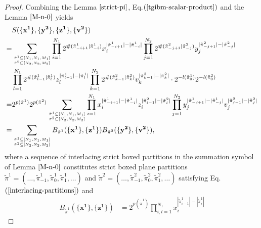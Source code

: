 \documentclass[11pt,reqno]{amsart}
\numberwithin{equation}{section}
\begin{document}
	\begin{proof}
		Combining the Lemma $\ref{strict-pi}$, Eq.$(\ref{tgibm-scalar-product})$ and the Lemma $\ref{M-n-0}$ yields
		\begin{align}\label{scalar-product-A1-A2}
			&S(\{\mathbf{x^1}\}, \{\mathbf{y^2}\}, \{\mathbf{z^1}\}, \{\mathbf{v^2}\})\notag\\
			=&
			\sum_{{\tilde{\pi}^{1} \subseteq [N_{1}, N_{1}, M_{1}]}
				\atop{\tilde{\pi}^{2} \subseteq [N_{2}, N_{2}, M_{2}]}}
			\prod_{i=1}^{N_1}
			2^{\#(\tilde{\pi}^{1}_{-i+1}|\tilde{\pi}^{1}_{-i}) }		
			x_i^{|\tilde{\pi}^{1}_{-i+1}| - |\tilde{\pi}^{1}_{-i}|}
			\prod_{j=1}^{N_2}
			2^{\#(\tilde{\pi}^{2}_{-j+1}|\tilde{\pi}^{2}_{-j}) }		
			y_j^{|\tilde{\pi}^{2}_{-j+1}| - |\tilde{\pi}^{2}_{-j}|}
			\notag\\
			&
			\prod_{l=1}^{N_1}
			2^{\#(\tilde{\pi}^{1}_{l-1}|\tilde{\pi}^{1}_{l}) }		
			z_l^{|\tilde{\pi}^{1}_{l-1}| - |\tilde{\pi}^{1}_l|}
			\prod_{k=1}^{N_2}
			2^{\#(\tilde{\pi}^{2}_{k-1}|\tilde{\pi}^{2}_{k}) }		
			v_k^{|\tilde{\pi}^{2}_{k-1}| - |\tilde{\pi}^{2}_k|}
			\cdot 2^{-l(\tilde{\pi}^{1}_{0})} 2^{-l(\tilde{\pi}^{2}_{0})}
			\notag\\
			=&2^{p(\tilde{\pi}^1)}2^{p(\tilde{\pi}^2)}
			\sum_{{\tilde{\pi}^{1} \subseteq [N_{1}, N_{1}, M_{1}]}
				\atop{\tilde{\pi}^{2} \subseteq [N_{2}, N_{2}, M_{2}]}}
			\prod_{i=1}^{N_1}
			x_i^{|\tilde{\pi}^{1}_{-i+1}| - |\tilde{\pi}^{1}_{-i}|}
			z_i^{|\tilde{\pi}^{2}_{i-1}| - |\tilde{\pi}^{2}_i|}
			\prod_{j=1}^{N_2}
			y_j^{|\tilde{\pi}^{1}_{-j+1}| - |\tilde{\pi}^{1}_{-j}|}
			v_j^{|\tilde{\pi}^{2}_{j-1}| - |\tilde{\pi}^{2}_j|}	\notag\\
			=&
			\sum_{{\tilde{\pi}^{1} \subseteq [N_{1}, N_{1}, M_{1}]}
				\atop{\tilde{\pi}^{2} \subseteq [N_{2}, N_{2}, M_{2}]}}
			B_{\tilde{\pi}^{1} }(\{\mathbf{x^1}\}, \{\mathbf{z^1}\}) B_{\tilde{\pi}^{2} }(\{\mathbf{y^2}\}, \{\mathbf{v^2}\}),
		\end{align}
		where a sequence of interlacing strict boxed partitions in the summation symbol of Lemma $\ref{M-n-0}$  constitutes  strict boxed  plane partitions $\tilde{\pi}^{1}=(\ldots,\tilde{\pi}_{-1}^{1},\tilde{\pi}_{0}^{1},\tilde{\pi}_{1}^{1},\ldots)$ and  $\tilde{\pi}^{2}=(\ldots,\tilde{\pi}_{-1}^{2},\tilde{\pi}_{0}^{2},\tilde{\pi}_{1}^{2},\ldots)$  satisfying Eq.$(\ref{interlacing-partitions})$
		and
		\begin{align}
			B_{\tilde{\pi}^{1} }(\{\mathbf{x^1}\}, \{\mathbf{z^1}\})
			&=2^{p(\tilde{\pi}^1)}
			\prod_{i,l=1}^{N_1}
			x_i^{|\tilde{\pi}^{1}_{i-1}| - |\tilde{\pi}^{1}_i|}

\end{align}
\end{proof}
\end{document}
